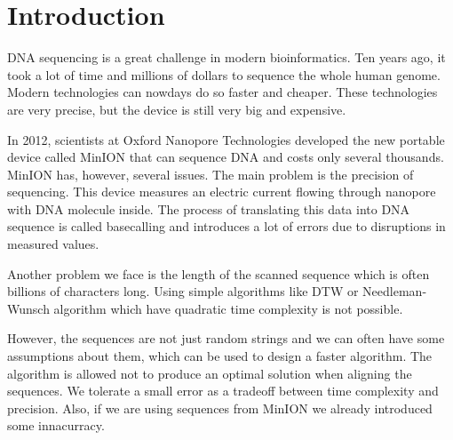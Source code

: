 \chapter*{Introduction} %

DNA sequencing is a great challenge in modern bioinformatics. Ten years ago, it took a lot of time
and millions of dollars to sequence the whole human genome. Modern technologies can nowdays do so
faster and cheaper. These technologies are very precise, but the device is still very big and
expensive. \cite{barbora_bakalarka}

In 2012, scientists at Oxford Nanopore Technologies developed the new portable device
called MinION that can sequence DNA and costs only several thousands. MinION has, however, several
issues. The main problem is the precision of sequencing. This device measures an electric current
flowing through nanopore with DNA molecule inside. The process of translating this data into DNA
sequence is called basecalling and introduces a lot of errors due to disruptions in measured values.

Another problem we face is the length of the scanned sequence which is often billions of characters
long. Using simple algorithms like DTW or Needleman-Wunsch algorithm which have quadratic time
complexity is not possible.

However, the sequences are not just random strings and we can often have some assumptions about
them, which can be used to design a faster algorithm. The algorithm is allowed not to produce an
optimal solution when aligning the sequences. We tolerate a small error as a tradeoff between time
complexity and precision. Also, if we are using sequences from MinION we already introduced some
innacurracy.
